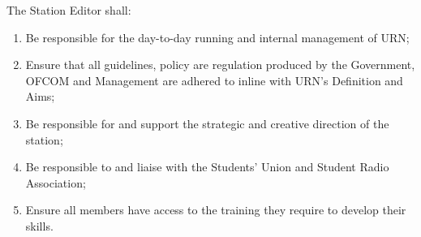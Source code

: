 \item The Station Editor shall:
\begin{enumerate}[label*=\arabic*.]
    \item Be responsible for the day-to-day running and internal management of URN;
    \item Ensure that all guidelines, policy are regulation produced by the Government, OFCOM and Management are adhered to inline with URN's Definition and Aims;
    \item Be responsible for and support the strategic and creative direction of the station;
    \item Be responsible to and liaise with the Students’ Union and Student Radio Association;
    \item Ensure all members have access to the training they require to develop their skills.
\end{enumerate}
